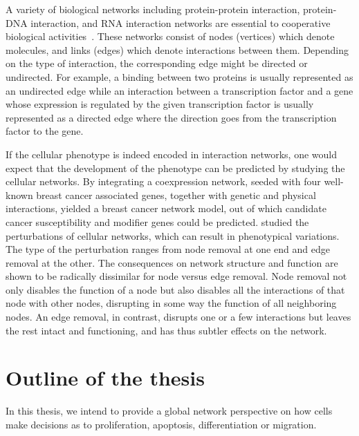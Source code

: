 
A variety of biological networks including protein-protein interaction, protein-DNA interaction, and RNA interaction networks are essential to cooperative biological activities~\citep{Zhu2007a}. These networks consist of nodes (vertices) which denote molecules, and links (edges) which denote interactions between them. Depending on the type of interaction, the corresponding edge might be directed or undirected. For example, a binding between two proteins is usually represented as an undirected edge while an interaction between a transcription factor and a gene whose expression is regulated by the given transcription factor is usually represented as a directed edge where the direction goes from the transcription factor to the gene.

If the cellular phenotype is indeed encoded in interaction 
networks, one would expect that the development of the
phenotype can be predicted by studying the cellular
networks. By integrating a coexpression network, seeded with four well-known breast cancer
associated genes, together with genetic and physical interactions, \cite{Pujana2007} yielded a breast cancer network model, out of which candidate cancer susceptibility and modifier genes could be predicted.
\cite{Zhong2009} studied the
perturbations of cellular networks, which can result in phenotypical variations.
The type of the perturbation ranges from node removal at one end and edge removal at the other. The
consequences on network structure and function are shown
to be radically dissimilar for node versus edge removal. Node removal not only disables the function of a node but
also disables all the interactions of that node with other nodes,
disrupting in some way the function of all neighboring nodes. An edge removal, in contrast, disrupts one or a few interactions
but leaves the rest intact and functioning, and has thus 
subtler effects
on the network. 

\section{Outline of the thesis}
In this thesis, we intend to provide a global network
perspective on how cells make decisions as to proliferation,
apoptosis, differentiation or migration.

